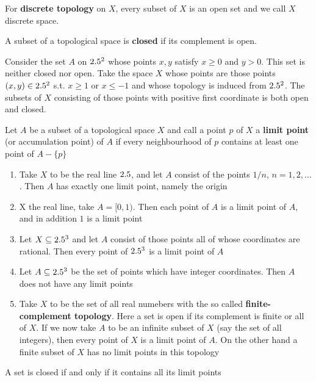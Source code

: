 \documentclass[11pt]{article}
\begin{document}
For \textbf{discrete topology} on \(X\), every subset of \(X\) is an open set and we
call \(X\) discrete space.

A subset of a topological space is \textbf{closed} if its complement is open.

Consider the set \(A\) on \(2.5^2\) whose points \(x,y\) satisfy \(x\ge0\) and
\(y>0\). This set is neither closed nor open. Take the space \(X\) whose
points are those points \((x,y)\in2.5^2\) s.t. \(x\ge1\) or \(x\le-1\) and
whose topology is induced from \(2.5^2\). The subsets of \(X\) consisting of
those points with positive first coordinate is both open and closed.


Let \(A\) be a subset of a topological space \(X\) and call a point \(p\) of
\(X\) a \textbf{limit point} (or accumulation point) of \(A\) if every neighbourhood
of \(p\) contains at least one point of \(A-\{p\}\)

\begin{examplle}[]
\begin{enumerate}
\item Take \(X\) to be the real line \(2.5\), and let \(A\) consist of the points
\(1/n\), \(n=1,2,\dots\). Then \(A\) has exactly one limit point, namely
the origin
\item X the real line, take \(A=[0,1)\). Then each point of \(A\) is a limit
point of \(A\), and in addition \(1\) is a limit point
\item Let \(X\subseteq2.5^3\) and let \(A\) consist of those points all of whose
coordinates are rational. Then every point of \(2.5^3\) is a limit point of \(A\)
\item Let \(A\subseteq2.5^3\) be the set of points which have integer
coordinates. Then \(A\) does not have any limit points
\item Take \(X\) to be the set of all real numebers with the so called
\textbf{finite-complement topology}. Here a set is open if its complement is
finite or all of \(X\). If we now take \(A\) to be an infinite subset of
\(X\) (say the set of all integers), then every point of \(X\) is a limit
point of \(A\). On the other hand a finite subset of \(X\) has no limit
points in this topology
\end{enumerate}
\end{examplle}

\begin{theorem}[]
A set is closed if and only if it contains all its limit points
\end{theorem}
\end{document}
